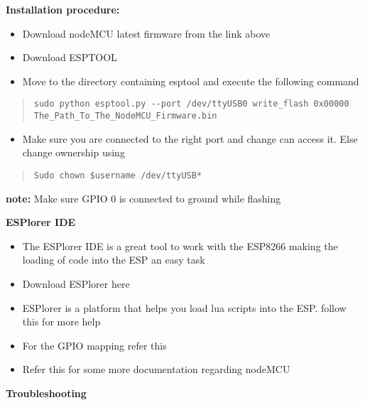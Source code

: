 \documentclass[16pt]{article}
\begin{document}
\textbf{Installation procedure:}

\begin{itemize}

\item
  Download nodeMCU latest firmware from the link above
\item
  Download ESPTOOL
\item
  Move to the directory containing esptool and execute the following
  command
\end{itemize}

\begin{quote}
\texttt{sudo python esptool.py -{}-port /dev/ttyUSB0  write\_flash 0x00000 The\_Path\_To\_The\_NodeMCU\_Firmware.bin}
\end{quote}

\begin{itemize}

\item
  Make sure you are connected to the right port and change can access
  it. Else change ownership using
\end{itemize}

\begin{quote}
\texttt{Sudo chown \$username /dev/ttyUSB*}
\end{quote}

\textbf{note:} Make sure GPIO 0 is connected to ground while flashing
\vspace{0.5cm}

\textbf{ESPlorer IDE}

\begin{itemize}

\item
  The ESPlorer IDE is a great tool to work with the ESP8266 making the
  loading of code into the ESP an easy task
\item
  Download ESPlorer here
\item
  ESPlorer is a platform that helps you load lua scripts into the ESP.
  follow this for more help
\item
  For the GPIO mapping refer this
\item
  Refer this for some more documentation regarding nodeMCU
\end{itemize}

\textbf{Troubleshooting}
\end{document}
